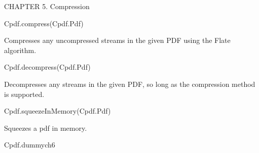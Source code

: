 CHAPTER 5. Compression

Cpdf.compress(Cpdf.Pdf)

Compresses any uncompressed streams in the given PDF
using the Flate algorithm.

Cpdf.decompress(Cpdf.Pdf)

Decompresses any streams in the given PDF, so long as
the compression method is supported.

Cpdf.squeezeInMemory(Cpdf.Pdf)

Squeezes a pdf in memory.

Cpdf.dummych6

